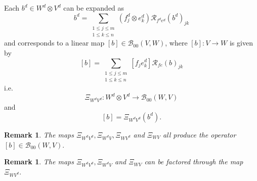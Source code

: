 \documentclass[aps,preprint]{revtex4}%
\newtheorem{remark}[theorem]{Remark}
\begin{document}
Each $b^{d}\in W^{d}\otimes V^{d}$ can be expanded as
\begin{equation}
b^{d}=\sum_{\substack{1\leq j\leq m\\1\leq k\leq n}}\left(  f_{j}^{d}\otimes
e_{k}^{d}\right)  \mathcal{R}_{f^{d}e^{d}}\left(  b^{d}\right)  _{jk}%
\end{equation}
and corresponds to a linear map $\left[  b\right]  \in\mathcal{B}_{00}\left(
V,W\right)  $, where $\left[  b\right]  :V\rightarrow W$ is given by
\begin{equation}
\left[  b\right]  =\sum_{\substack{1\leq j\leq m\\1\leq k\leq n}}\left[
f_{j}e_{k}^{d}\right]  \mathcal{R}_{fe}\left(  b\right)  _{jk}%
\end{equation}
i.e.
\begin{equation}
\Xi_{W^{d}V^{d}}:W^{d}\otimes V^{d}\rightarrow\mathcal{B}_{00}\left(
W,V\right)
\end{equation}
and
\begin{equation}
\left[  b\right]  =\Xi_{W^{d}V^{d}}\left(  b^{d}\right)  .
\end{equation}


\begin{remark}
The maps $\Xi_{W^{d}V^{d}},\Xi_{W^{d}V},\Xi_{WV^{d}}$ and $\Xi_{WV}$ all
produce the operator $\left[  b\right]  \in\mathcal{B}_{00}\left(  W,V\right)
.$
\end{remark}

\begin{remark}
The maps $\Xi_{W^{d}V^{d}},\Xi_{W^{d}V}$ and $\Xi_{WV}$ can be factored
through the map $\Xi_{WV^{d}}.$
\end{remark}
\end{document}
